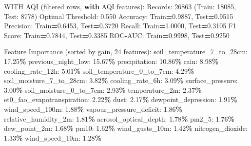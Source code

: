 \documentclass[
  letterpaper,
  DIV=11,
  numbers=noendperiod]{scrartcl}
\newenvironment{Shaded}{\begin{snugshade}}{\end{snugshade}}
\newcommand{\BuiltInTok}[1]{#1}
\newcommand{\ControlFlowTok}[1]{\textcolor[rgb]{0.13,0.29,0.53}{\textbf{#1}}}
\newcommand{\DecValTok}[1]{\textcolor[rgb]{0.00,0.00,0.81}{#1}}
\newcommand{\FloatTok}[1]{\textcolor[rgb]{0.00,0.00,0.81}{#1}}
\newcommand{\NormalTok}[1]{#1}
\newcommand{\OperatorTok}[1]{\textcolor[rgb]{0.81,0.36,0.00}{\textbf{#1}}}
\begin{document}
\begin{Shaded}
\begin{Highlighting}[]
\NormalTok{WITH AQI (filtered rows, }\ControlFlowTok{with}\NormalTok{ AQI features):}
\NormalTok{  Records: }\DecValTok{26863}\NormalTok{ (Train: }\DecValTok{18085}\NormalTok{, Test: }\DecValTok{8778}\NormalTok{)}
\NormalTok{  Optimal Threshold: }\FloatTok{0.550}
\NormalTok{  Accuracy: Train}\OperatorTok{=}\FloatTok{0.9887}\NormalTok{, Test}\OperatorTok{=}\FloatTok{0.9515}
\NormalTok{  Precision: Train}\OperatorTok{=}\FloatTok{0.6453}\NormalTok{, Test}\OperatorTok{=}\FloatTok{0.3720}
\NormalTok{  Recall: Train}\OperatorTok{=}\FloatTok{1.0000}\NormalTok{, Test}\OperatorTok{=}\FloatTok{0.3105}
\NormalTok{  F1 Score: Train}\OperatorTok{=}\FloatTok{0.7844}\NormalTok{, Test}\OperatorTok{=}\FloatTok{0.3385}
\NormalTok{  ROC}\OperatorTok{{-}}\NormalTok{AUC: Train}\OperatorTok{=}\FloatTok{0.9998}\NormalTok{, Test}\OperatorTok{=}\FloatTok{0.9250}

\NormalTok{  Feature Importance (}\BuiltInTok{sorted}\NormalTok{ by gain, }\DecValTok{24}\NormalTok{ features):}
\NormalTok{    soil\_temperature\_7\_to\_28cm: }\FloatTok{17.25}\OperatorTok{\%}
\NormalTok{    previous\_night\_low: }\FloatTok{15.67}\OperatorTok{\%}
\NormalTok{    precipitation: }\FloatTok{10.86}\OperatorTok{\%}
\NormalTok{    rain: }\FloatTok{8.98}\OperatorTok{\%}
\NormalTok{    cooling\_rate\_12h: }\FloatTok{5.01}\OperatorTok{\%}
\NormalTok{    soil\_temperature\_0\_to\_7cm: }\FloatTok{4.29}\OperatorTok{\%}
\NormalTok{    soil\_moisture\_7\_to\_28cm: }\FloatTok{3.82}\OperatorTok{\%}
\NormalTok{    cooling\_rate\_6h: }\FloatTok{3.09}\OperatorTok{\%}
\NormalTok{    surface\_pressure: }\FloatTok{3.00}\OperatorTok{\%}
\NormalTok{    soil\_moisture\_0\_to\_7cm: }\FloatTok{2.93}\OperatorTok{\%}
\NormalTok{    temperature\_2m: }\FloatTok{2.37}\OperatorTok{\%}
\NormalTok{    et0\_fao\_evapotranspiration: }\FloatTok{2.22}\OperatorTok{\%}
\NormalTok{    dust: }\FloatTok{2.17}\OperatorTok{\%}
\NormalTok{    dewpoint\_depression: }\FloatTok{1.91}\OperatorTok{\%}
\NormalTok{    wind\_speed\_100m: }\FloatTok{1.88}\OperatorTok{\%}
\NormalTok{    vapour\_pressure\_deficit: }\FloatTok{1.86}\OperatorTok{\%}
\NormalTok{    relative\_humidity\_2m: }\FloatTok{1.81}\OperatorTok{\%}
\NormalTok{    aerosol\_optical\_depth: }\FloatTok{1.78}\OperatorTok{\%}
\NormalTok{    pm2\_5: }\FloatTok{1.76}\OperatorTok{\%}
\NormalTok{    dew\_point\_2m: }\FloatTok{1.68}\OperatorTok{\%}
\NormalTok{    pm10: }\FloatTok{1.62}\OperatorTok{\%}
\NormalTok{    wind\_gusts\_10m: }\FloatTok{1.42}\OperatorTok{\%}
\NormalTok{    nitrogen\_dioxide: }\FloatTok{1.33}\OperatorTok{\%}
\NormalTok{    wind\_speed\_10m: }\FloatTok{1.28}\OperatorTok{\%}


\end{Highlighting}
\end{Shaded}
\end{document}
